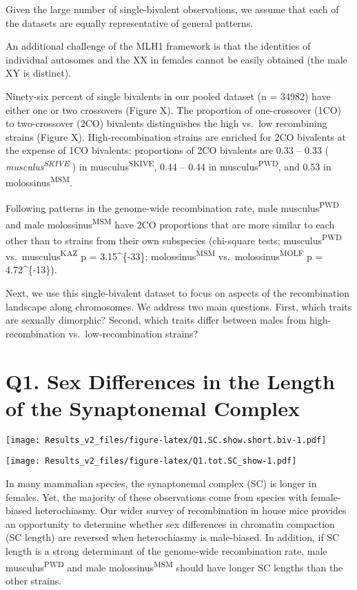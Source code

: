 \documentclass[]{article}
\begin{document}
Given the large number of single-bivalent observations, we assume that
each of the datasets are equally representative of general patterns.

An additional challenge of the MLH1 framework is that the identities of
individual autosomes and the XX in females cannot be easily obtained
(the male XY is distinct).

Ninety-six percent of single bivalents in our pooled dataset (n = 34982)
have either one or two crossovers (Figure X). The proportion of
one-crossover (1CO) to two-crossover (2CO) bivalents distinguishes the
high vs.~low recombining strains (Figure X). High-recombination strains
are enriched for 2CO bivalents at the expense of 1CO bivalents:
proportions of 2CO bivalents are 0.33 -- 0.33 (
\emph{musculus\textsuperscript{SKIVE}} ) in
musculus\textsuperscript{SKIVE}, 0.44 -- 0.44 in
musculus\textsuperscript{PWD}, and 0.53 in
molossinus\textsuperscript{MSM}.

Following patterns in the genome-wide recombination rate, male
musculus\textsuperscript{PWD} and male molossinus\textsuperscript{MSM}
have 2CO proportions that are more similar to each other than to strains
from their own subspecies (chi-square tests;
musculus\textsuperscript{PWD} vs.~musculus\textsuperscript{KAZ} p =
3.15\^{}\{-33\}; molossinus\textsuperscript{MSM}
vs.~molossinus\textsuperscript{MOLF} p = 4.72\^{}\{-13\}).

Next, we use this single-bivalent dataset to focus on aspects of the
recombination landscape along chromosomes. We address two main
questions. First, which traits are sexually dimorphic? Second, which
traits differ between males from high-recombination
vs.~low-recombination strains?

\section{Q1. Sex Differences in the Length of the Synaptonemal
Complex}\label{q1.-sex-differences-in-the-length-of-the-synaptonemal-complex}

\texttt{[image: Results\_v2\_files/figure-latex/Q1.SC.show.short.biv-1.pdf]}

\texttt{[image: Results\_v2\_files/figure-latex/Q1.tot.SC\_show-1.pdf]}

In many mammalian species, the synaptonemal complex (SC) is longer in
females. Yet, the majority of these observations come from species with
female-biased heterochiasmy. Our wider survey of recombination in house
mice provides an opportunity to determine whether sex differences in
chromatin compaction (SC length) are reversed when heterochiasmy is
male-biased. In addition, if SC length is a strong determinant of the
genome-wide recombination rate, male musculus\textsuperscript{PWD} and
male molossinus\textsuperscript{MSM} should have longer SC lengths than
the other strains.
\end{document}

